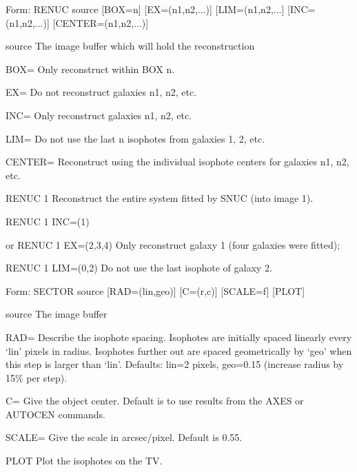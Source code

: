 {\newpage\clearpage
{}%
\begin{command} 
  \item[Form: RENUC source {[BOX=n]} {[EX=(n1,n2,...)]} {[LIM=(n1,n2,...]}
       {[INC=(n1,n2,...)]} {[CENTER=(n1,n2,...)]}\hfill]{}
  \item[source]{The image buffer which will hold the reconstruction}
  \item[BOX=]{Only reconstruct within BOX n.}
  \item[EX=]{Do not reconstruct galaxies n1, n2, etc.}
  \item[INC=]{Only reconstruct galaxies n1, n2, etc.}
  \item[LIM=]{Do not use the last n isophotes from galaxies 1, 2, etc.}
  \item[CENTER=]{Reconstruct using the individual isophote centers for
       galaxies n1, n2, etc.}
\end{command}%
\lthtmlfigureZ
\lthtmlcheckvsize\clearpage}

{\newpage\clearpage
{}%
\begin{example}
  \item[RENUC 1\hfill]{Reconstruct the entire system fitted by SNUC (into
       image 1).}
\par\item[RENUC 1 INC=(1) \hfill]{}
\par\item[or RENUC 1 EX=(2,3,4)\hfill]{Only reconstruct galaxy 1 (four
       galaxies were fitted);}
\par\item[RENUC 1 LIM=(0,2)\hfill]{Do not use the last isophote of galaxy 2.}
\end{example}%
\lthtmlfigureZ
\lthtmlcheckvsize\clearpage}

{\newpage\clearpage
{}%
\begin{command}
  \item[Form: SECTOR source {[RAD=(lin,geo)]} {[C=(r,c)]} {[SCALE=f]} 
       {[PLOT]}\hfill]{}
  \item[source]{The image buffer}
  \item[RAD=]{Describe the isophote spacing. Isophotes are initially spaced
       linearly every `lin' pixels in radius. Isophotes further out are
       spaced geometrically by `geo' when this step is larger than `lin'.
       Defaults: lin=2 pixels, geo=0.15 (increase radius by 15\% per
       step).}
  \item[C=]{Give the object center.  Default is to use results from
       the AXES or AUTOCEN commands.}
  \item[SCALE=]{Give the scale in arcsec/pixel. Default is 0.55.}
  \item[PLOT]{Plot the isophotes on the TV.}
\end{command}%
\lthtmlfigureZ
\lthtmlcheckvsize\clearpage}

